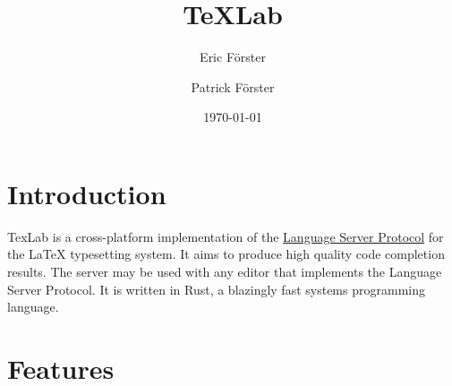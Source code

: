 \documentclass{article}
\date{\today}
\author{Eric Förster \and Patrick Förster}
\title{\TeX{}Lab}
\begin{document}
\maketitle{}

\section{Introduction}

TexLab is a cross-platform implementation of the
\href{https://microsoft.github.io/language-server-protocol/specifications/specification-current/}{Language Server Protocol}
for the \LaTeX{} typesetting system.
It aims to produce high quality code completion results.
The server may be used with any editor that implements the Language Server Protocol.
It is written in Rust, a blazingly fast systems programming language.

\section{Features}
\end{document}
